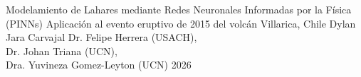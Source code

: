 
\metadatos
	{Modelamiento de Lahares mediante Redes Neuronales Informadas por la Física (PINNs)} %
	{Aplicación al evento eruptivo de 2015 del volcán Villarica, Chile} %
	{Dylan Jara Carvajal} %
	{Dr. Felipe Herrera (USACH), \\Dr. Johan Triana (UCN), \\Dra. Yuvineza Gomez-Leyton (UCN)} %
	{} %
	{} %
	{2026} %